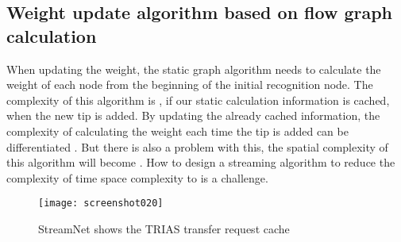 \documentclass{article}
\begin{document}

\subsection{Weight update algorithm based on flow graph calculation}
When updating the weight, the static graph algorithm needs to calculate the weight of each node from the beginning of the initial recognition node. The complexity of this algorithm is , if our static calculation information is cached, when the new tip is added. By updating the already cached information, the complexity of calculating the weight each time the tip is added can be differentiated . But there is also a problem with this, the spatial complexity of this algorithm will become . How to design a streaming algorithm to reduce the complexity of time space complexity to  is a challenge.

\begin{figure}[H]
	\centering
	\texttt{[image: screenshot020]}
	\caption{StreamNet shows the TRIAS transfer request cache}
	\label{simulationfigure}
\end{figure}
\end{document}
